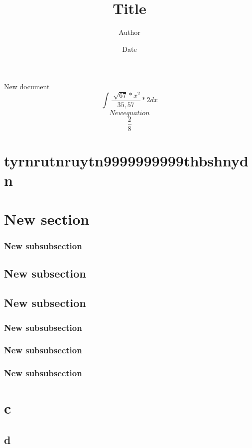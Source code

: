 \documentclass{article}
\begin{document}
\title{Title}
\author{Author}
\date{Date}
\maketitle
New document
\begin{equation} \int^{}_{}\frac{\sqrt[]{67}*x^{2}}{35,57}*2dx \end{equation}
\begin{equation}  New equation  \end{equation}
\begin{equation}  \frac{2}{8}  \end{equation}
\section{\textnormal{tyrnrutnruytn999\textbf{9999999thbshnydn}}}
\tableofcontents
\section{\textnormal{New section}}
\subsubsection{\textnormal{New subsubsection}}
\subsection{\textnormal{New subsection}}
\subsection{\textnormal{New subsection}}
\subsubsection{\textnormal{New subsubsection}}
\subsubsection{\textnormal{New subsubsection}}
\subsubsection{\textnormal{New subsubsection}}
\newpage
\section{\textnormal{c}}
\subsection{\textnormal{d}}
\end{document}
